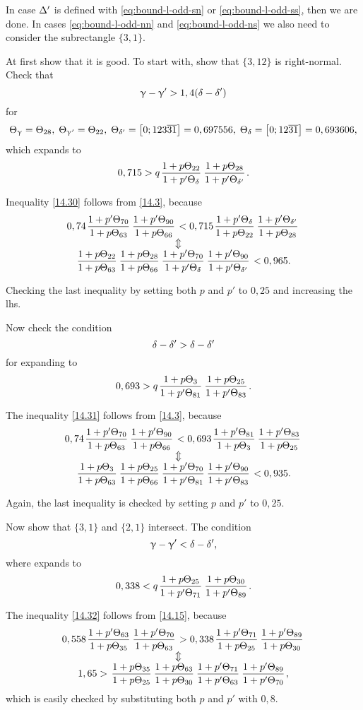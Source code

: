 In case $\Delta'$ is defined with \ref{eq:bound-l-odd-sn} or \ref{eq:bound-l-odd-ss},
then we are done.
In cases \ref{eq:bound-l-odd-nn} and \ref{eq:bound-l-odd-ns}
we also need to consider the subrectangle $\{3, 1\}$.

At first show that it is good.
To start with, show that $\{3, 12\}$ is right-normal.
Check that
\begin{equation*}
	\upgamma - \upgamma' > 1,4 (\delta - \delta')
\end{equation*}
for
\begin{equation*}
	\Theta_{\upgamma} = \Theta_{28},\;
	\Theta_{\upgamma'} = \Theta_{22},\;
	\Theta_{\delta'} = \left[0; 123\overline{31}\right] = 0,697556,\;
	\Theta_{\delta} = \left[0; 12\overline{31}\right] = 0,693606,
\end{equation*}
which expands to
\begin{equation}\label{14.30}
	0,715 > q \up{22}{\d} \up{28}{\d'}.
\end{equation}

Inequality \ref{14.30} follows from \ref{14.3}, because
\begin{gather*}
	0,74 \pu{70}{63} \pu{90}{66} < 0,715 \pu{\d}{22} \pu{\d'}{28}\\
	\ArrowBetweenLines
	\uu{22}{63} \uu{28}{66} \pp{70}{\d} \pp{90}{\d'} < 0,965.
\end{gather*}

Checking the last inequality by setting both $p$ and $p'$ to $0,25$ and increasing the lhs.

Now check the condition
\begin{equation*}
	\delta - \delta' > \delta - \delta'
\end{equation*}
for
expanding to
\begin{equation}\label{14.31}
	0,693 > q \up{3}{81} \up{25}{83}.
\end{equation}

The inequality \ref{14.31} follows from \ref{14.3}, because
\begin{gather*}
	0,74 \pu{70}{63} \pu{90}{66} < 0,693 \pu{81}{3} \pu{83}{25}\\
	\ArrowBetweenLines
	\uu{3}{63} \uu{25}{66} \pp{70}{81} \pp{90}{83} < 0,935.
\end{gather*}

Again, the last inequality is checked by setting $p$ and $p'$ to $0,25$.

Now show that $\{3, 1\}$ and $\{2, 1\}$ intersect.
The condition
\begin{equation*}
	\upgamma - \upgamma' < \delta - \delta',
\end{equation*}
where
expands to
\begin{equation}\label{14.32}
	0,338 < q \up{25}{71} \up{30}{89}.
\end{equation}

The inequality \ref{14.32} follows from \ref{14.15}, because
\begin{gather*}
	0,558 \pu{63}{35} \pu{70}{63} > 0,338 \pu{71}{25} \pu{89}{30}\\
	\ArrowBetweenLines
	1,65 > \uu{35}{25} \uu{63}{30} \pp{71}{63} \pp{89}{70},
\end{gather*}
which is easily checked by substituting both $p$ and $p'$ with $0,8$.